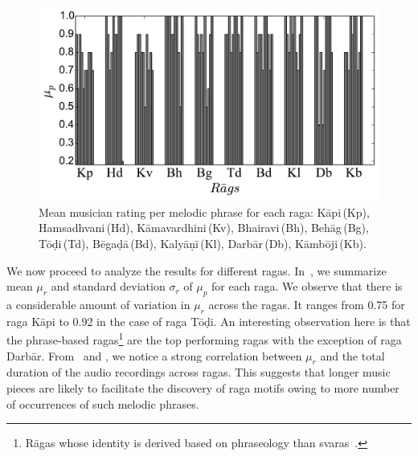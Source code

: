{\begin{figure}
	\begin{center}
		\includegraphics[width=\figSizeEighty]{ch06_patterns/figures/Characterization/per_raaga_per_phrase_rating.pdf}
	\end{center}
	\caption{Mean musician rating per melodic phrase for each \gls{raga}: K\={a}pi\,(Kp), Hamsadhvani\,(Hd), K\={a}mavardhini\,(Kv), Bhairavi\,(Bh), Beh\={a}g\,(Bg), T\={o}\d{d}i\,(Td), B\={e}ga\d{d}\={a}\,(Bd), Kaly\={a}\d{n}\={i}\,(Kl), Darb\={a}r\,(Db), K\={a}mb\={o}ji\,(Kb).}
	\label{fig:average_rating_pattern_characterization}
\end{figure}


We now proceed to analyze the results for different \glspl{raga}. In~, we summarize mean $\mu_r$ and standard deviation $\sigma_r$ of $\mu_p$ for each \gls{raga}. We observe that there is a considerable amount of variation in $\mu_r$ across the \glspl{raga}. It ranges from 0.75 for \gls{raga} K\={a}pi to 0.92 in the case of \gls{raga} T\={o}\d{d}i. An interesting observation here is that the phrase-based \glspl{raga}\footnote{R\={a}gas whose identity is derived based on phraseology than svaras~\cite{krishna2012carnatic}.} are the top performing \glspl{raga} with the  exception of \gls{raga} Darb\={a}r. From~ and , we notice a strong correlation between $\mu_r$ and the total duration of the audio recordings across \glspl{raga}. This suggests that longer music pieces are likely to facilitate the discovery of \gls{raga} motifs owing to more number of occurrences of such melodic phrases.

}
